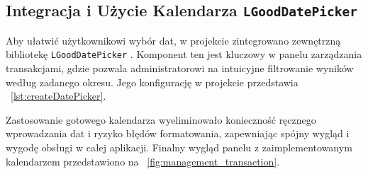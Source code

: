 \begin{minipage}{\linewidth}
\subsection{Integracja i Użycie Kalendarza \texttt{LGoodDatePicker}}
Aby ułatwić użytkownikowi wybór dat, w projekcie zintegrowano zewnętrzną bibliotekę \texttt{LGoodDatePicker} \cite{LGoodDatePicker}. Komponent ten jest kluczowy w panelu zarządzania transakcjami, gdzie pozwala administratorowi na intuicyjne filtrowanie wyników według zadanego okresu. Jego konfigurację w projekcie przedstawia \listingname~\ref{lst:createDatePicker}.

Zastosowanie gotowego kalendarza wyeliminowało konieczność ręcznego wprowadzania dat i ryzyko błędów formatowania, zapewniając spójny wygląd i wygodę obsługi w całej aplikacji. Finalny wygląd panelu z zaimplementowanym kalendarzem przedstawiono na \figurename~\ref{fig:management_transaction}.



\end{minipage}